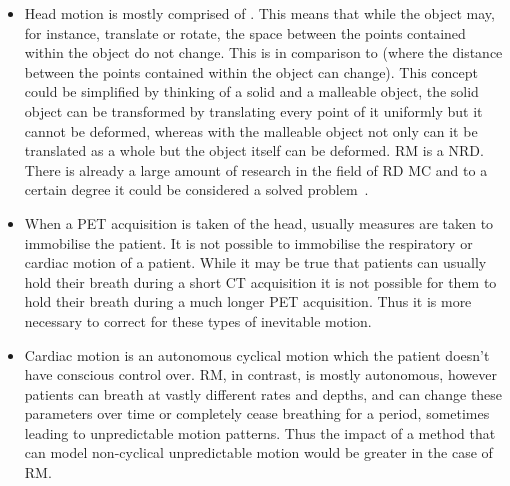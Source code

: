         \begin{itemize}
            \item Head motion is mostly comprised of . This means that while the object may, for instance, translate or rotate, the space between the points contained within the object do not change. This is in comparison to  (where the distance between the points contained within the object can change). This concept could be simplified by thinking of a solid and a malleable object, the solid object can be transformed by translating every point of it uniformly but it cannot be deformed, whereas with the malleable object not only can it be translated as a whole but the object itself can be deformed. \gls{RM} is a \gls{NRD}. There is already a large amount of research in the field of \gls{RD} \gls{MC} and to a certain degree it could be considered a solved problem~.
                
            \item When a \gls{PET} acquisition is taken of the head, usually measures are taken to immobilise the patient. It is not possible to immobilise the respiratory or cardiac motion of a patient. While it may be true that patients can usually hold their breath during a short \gls{CT} acquisition it is not possible for them to hold their breath during a much longer \gls{PET} acquisition. Thus it is more necessary to correct for these types of inevitable motion.
    
            \item Cardiac motion is an autonomous cyclical motion which the patient doesn't have conscious control over. \gls{RM}, in contrast, is mostly autonomous, however patients can breath at vastly different rates and depths, and can change these parameters over time or completely cease breathing for a period, sometimes leading to unpredictable motion patterns. %
            Thus the impact of a method that can model non-cyclical unpredictable motion would be greater in the case of \gls{RM}.
        \end{itemize}
    
